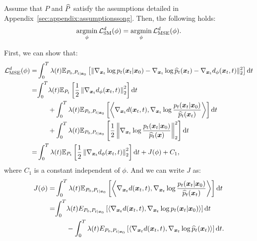 \begin{proposition}
    Assume that $P$ and $\widehat P$ satisfy the assumptions detailed in Appendix~\ref{sec:appendix:assumptionssong}.
    Then, the following holds:
    \begin{equation}
        \operatorname*{argmin}_\phi \mathcal{L}_{\mathrm{SM}}^{d}(\phi) = \operatorname*{argmin}_\phi \mathcal{L}_{\mathrm{MSE}}^{d}(\phi).
    \end{equation} 
\end{proposition}
First, we can show that:
\begin{align}
    \mathcal{L}_{\mathrm{MSE}}^{d}(\phi) =& \int_0^T\lambda(t)   \mathbb{E}_{P_0, P_{t\vert\boldsymbol{x}_0}}\left[\Vert \nabla_{\boldsymbol{x}_t} \log p_t(\boldsymbol{x}_t\vert\boldsymbol{x}_0) - \nabla_{\boldsymbol{x}_t} \log \widehat p_t(\boldsymbol{x}_t) - \nabla_{\boldsymbol{x}_t} d_\phi(\boldsymbol{x}_t, t)\Vert_2^2 \right]\mathrm{d} t \\
    =& \begin{aligned}[t]
        \int_0^T&\lambda(t) \mathbb{E}_{P_t}\left[\frac{1}{2}\left\Vert\nabla_{\boldsymbol{x}_t} d_\phi(\boldsymbol{x}_t, t)\right\Vert_2^2\right] \mathrm{d} t \\
        &+ \int_0^T\lambda(t) \mathbb{E}_{P_0, P_{t\vert\boldsymbol{x}_0}}\left[\left\langle \nabla_{\boldsymbol{x}_t}d(\boldsymbol{x}_t, t), \nabla_{\boldsymbol{x}_t} \log \frac{p_t(\boldsymbol{x}_t\vert\boldsymbol{x}_0)}{\widehat p_t(\boldsymbol{x}_t)}\right\rangle\right] \mathrm{d} t \\
        &+ \int_0^T\lambda(t) \mathbb{E}_{P_0, P_{t\vert\boldsymbol{x}_0}}\left[\frac{1}{2}\left\Vert\nabla_{\boldsymbol{x}_t} \log \frac{p_t(\boldsymbol{x}_t\vert\boldsymbol{x}_0)}{\widehat p_t(\boldsymbol{x})}\right\Vert_2^2\right] \mathrm{d} t 
    \end{aligned}\\
    =& \int_0^T\lambda(t) \mathbb{E}_{P_t}\left[\frac{1}{2}\left\Vert\nabla_{\boldsymbol{x}_t} d_\phi(\boldsymbol{x}_t, t)\right\Vert_2^2\right] \mathrm{d} t + J(\phi) + C_1,
\end{align}
where $C_1$ is a constant independent of $\phi$. And we can write $J$ as:
\begin{align}
    J(\phi) =& \int_0^T\lambda(t) \mathbb{E}_{P_0, P_{t\vert\boldsymbol{x}_0}}\left[\left\langle \nabla_{\boldsymbol{x}_t}d(\boldsymbol{x}_t, t), \nabla_{\boldsymbol{x}_t} \log \frac{p_t(\boldsymbol{x}_t\vert\boldsymbol{x}_0)}{\widehat p_t(\boldsymbol{x}_t)}\right\rangle\right] \mathrm{d} t \\
    =& \begin{aligned}[t]
       \int_0^T&\lambda(t) E_{P_0, P_{t\vert\boldsymbol{x}_0}}\left[\left\langle \nabla_{\boldsymbol{x}_t}d(\boldsymbol{x}_t, t), \nabla_{\boldsymbol{x}_t} \log p_t(\boldsymbol{x}_t\vert\boldsymbol{x}_0)\right\rangle\right] \mathrm{d} t \\
        &- \int_0^T\lambda(t) E_{P_0, P_{t\vert\boldsymbol{x}_0}}\left[\left\langle \nabla_{\boldsymbol{x}_t}d(\boldsymbol{x}_t, t), \nabla_{\boldsymbol{x}_t} \log \widehat p_t(\boldsymbol{x}_t)\right\rangle\right] \mathrm{d} t. 
    \end{aligned} 
\end{align}
